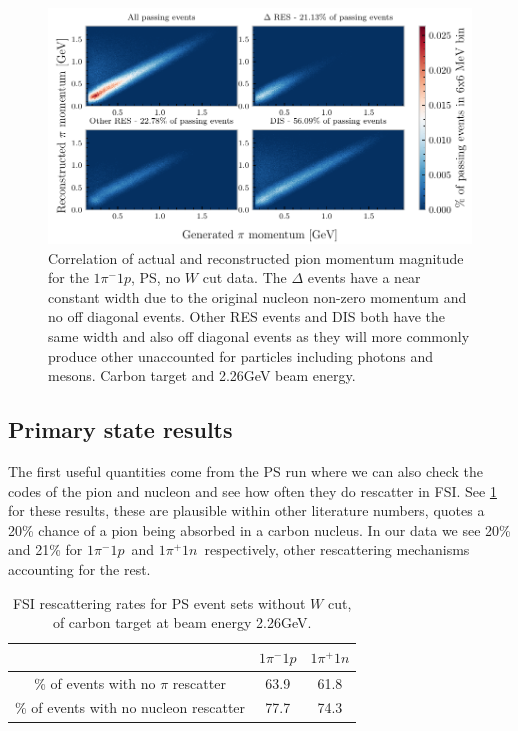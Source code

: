 \documentclass[a4paper,12pt]{article}
\newcommand{\verbb}[1]{\text{\Verb|#1|}}
\newcommand{\md}{$1\pi^-1p$}
\newcommand{\pd}{$1\pi^+1n$}
\begin{document}
\begin{figure}[H]
    \centering
    \includegraphics{figures/python/vs_pp_C_m_ps.pdf}
    \caption{
        Correlation of actual and reconstructed pion momentum magnitude for the \md, PS, no $W$ cut data.
        The $\Delta$ events have a near constant width due to the original nucleon non-zero momentum and no off diagonal events.
        Other RES events and DIS both have the same width and also off diagonal events as they will more commonly produce other unaccounted for particles including photons and mesons.
        Carbon target and 2.26\si{GeV} beam energy.
    }\label{fig:vs_pp_ps1}
\end{figure}

\subsection{Primary state results}
The first useful quantities come from the PS run where we can also check the \verbb{resc} codes of the pion and nucleon and see how often they do rescatter in FSI.
See \cref{tab:FSI_re} for these results, these are plausible within other literature numbers, \cite{stevendytmanFinalStateInteractions2009} quotes a 20\% chance of a pion being absorbed in a carbon nucleus.
In our data we see 20\% and 21\% for \md\ and \pd\ respectively, other rescattering mechanisms accounting for the rest.

\begin{table}[H]
    \begin{center}
        \begin{tabular}{ c | c | c }
            & \md & \pd \\
            \hline
            \% of events with no $\pi$ rescatter & 63.9 & 61.8 \\  
            \hline
            \% of events with no nucleon rescatter & 77.7 & 74.3 \\
        \end{tabular}
    \end{center}
    \caption{FSI rescattering rates for PS event sets without $W$ cut, of carbon target at beam energy 2.26\si{GeV}.}\label{tab:FSI_re}
\end{table}
\end{document}
